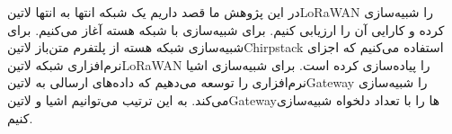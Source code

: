 
در این پژوهش ما قصد داریم یک شبکه انتها به انتها ‌لاتین{LoRaWAN}
را شبیه‌سازی کرده و کارایی آن را ارزیابی کنیم. برای شبیه‌سازی با شبکه هسته
آغاز می‌کنیم.
برای شبیه‌سازی شبکه هسته از پلتفرم متن‌باز ‌لاتین{Chirpstack} استفاده می‌کنیم
که اجزای نرم‌افزاری شبکه ‌لاتین{LoRaWAN} را پیاده‌سازی کرده است.
برای شبیه‌سازی اشیا نرم‌افزاری را توسعه می‌دهیم که داده‌های ارسالی به ‌لاتین{Gateway}
را شبیه‌سازی می‌کند. به این ترتیب می‌توانیم اشیا و ‌لاتین{Gateway}ها را با تعداد دلخواه
شبیه‌سازی کنیم.
